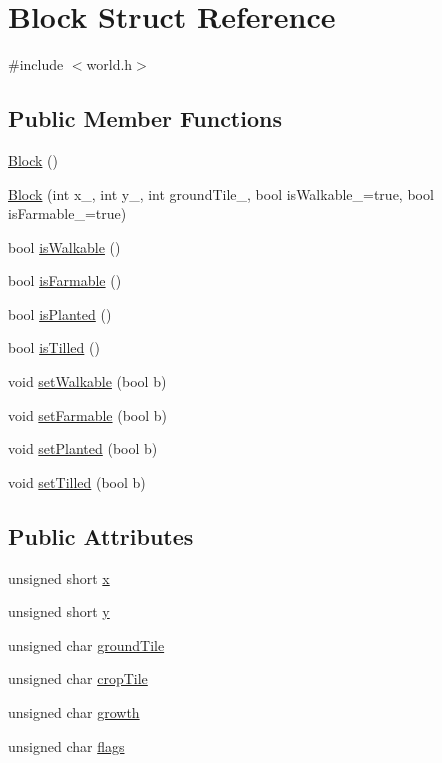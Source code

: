\hypertarget{struct_block}{\section{Block Struct Reference}
\label{struct_block}
}


{\ttfamily \#include $<$world.\-h$>$}

\subsection*{Public Member Functions}
\begin{DoxyCompactItemize}
\item 
\hyperlink{struct_block_a37658a946bf5067ad01d68d9ff086adc}{Block} ()
\item 
\hyperlink{struct_block_a148c2816eb1e9eae9e956512eb3e7025}{Block} (int x\-\_\-, int y\-\_\-, int ground\-Tile\-\_\-, bool is\-Walkable\-\_\-=true, bool is\-Farmable\-\_\-=true)
\item 
bool \hyperlink{struct_block_a5538b540df19626cdc7b218311af6b7c}{is\-Walkable} ()
\item 
bool \hyperlink{struct_block_a761d37f4e22b28282e5b73796221a8c5}{is\-Farmable} ()
\item 
bool \hyperlink{struct_block_a89e330e315f0f352f164618ca661ea49}{is\-Planted} ()
\item 
bool \hyperlink{struct_block_a72df9b60b3b8437046ff11532db590b0}{is\-Tilled} ()
\item 
void \hyperlink{struct_block_a495e5a9b45f4208e8cee275fe2678748}{set\-Walkable} (bool b)
\item 
void \hyperlink{struct_block_a76ff73a12407b56484089d13cbf16c57}{set\-Farmable} (bool b)
\item 
void \hyperlink{struct_block_a2f89a54fa20a792694de988f86d47e19}{set\-Planted} (bool b)
\item 
void \hyperlink{struct_block_a11a7aff3576e1a56480a4eeca5092a5f}{set\-Tilled} (bool b)
\end{DoxyCompactItemize}
\subsection*{Public Attributes}
\begin{DoxyCompactItemize}
\item 
unsigned short \hyperlink{struct_block_a7373a8e929823422dfcd4985a154d445}{x}
\item 
unsigned short \hyperlink{struct_block_af3d51fac75e91ac5ebf82acba62b5c1d}{y}
\item 
unsigned char \hyperlink{struct_block_a11fd4d71b43ede889013402709fbc1d0}{ground\-Tile}
\item 
unsigned char \hyperlink{struct_block_a7b78a9d429e2cc849e2c48e0bd99206e}{crop\-Tile}
\item 
unsigned char \hyperlink{struct_block_a24f37e79d1ed8f7fa0e695ebfb098386}{growth}
\item 
unsigned char \hyperlink{struct_block_abe93c385392d2a1c5476b27377aa2e65}{flags}
\end{DoxyCompactItemize}


